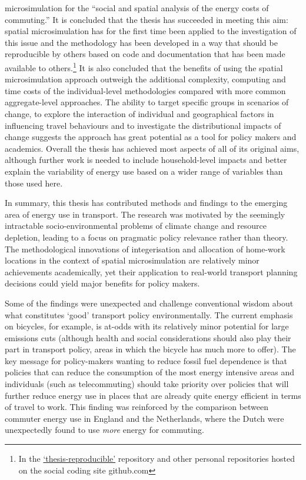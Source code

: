 microsimulation for the ``social and spatial analysis of the energy costs of
commuting.'' It is concluded that the thesis has succeeded in meeting this aim:
spatial microsimulation has for the first time been applied to the
investigation of this issue and the methodology has been developed in a way
that should be reproducible by others based on code and documentation that has
been made available to others.\footnote{In
the
{\color{blue}\href{https://github.com/Robinlovelace/thesis-reproducible}
{`thesis-reproducible'}} repository
and other personal repositories hosted on the social coding site github.com
}
It is also concluded that the benefits of using the spatial microsimulation
approach outweigh the additional complexity, computing and time costs of the
individual-level methodologies compared with more common aggregate-level
approaches. The ability to target specific groups in scenarios of change, to
explore the interaction of individual and geographical factors in influencing
travel behaviours and to investigate the distributional impacts of change
suggests the approach has great potential as a tool for policy makers and
academics. Overall the thesis has achieved most aspects of all of its original
aims, although further work is needed to include household-level impacts and
better explain the variability of energy use based on a wider range of
variables than those used here.

In summary, this thesis has contributed methods and findings to the emerging
area of energy use in transport. The research was motivated by the seemingly
intractable socio-environmental problems of climate change and resource
depletion, leading to a focus on pragmatic policy relevance rather than theory.
The methodological innovations of integerisation and allocation of home-work
locations in the context of spatial microsimulation are relatively minor
achievements academically, yet their application to real-world transport
planning decisions could yield major benefits for policy makers.

Some of the findings were unexpected and challenge conventional wisdom about
what constitutes `good' transport policy environmentally. The current
emphasis on bicycles, for example, is at-odds with its relatively
minor potential for large emissions cuts (although health and social
considerations should also play their part in transport policy, areas
in which the bicycle has much more to offer).
The key message for policy-makers wanting to reduce fossil fuel dependence
is that policies that can reduce the consumption
of the most energy intensive areas and individuals (such as telecommuting)
should take priority over policies that will further reduce energy use in
places that are already quite energy efficient in terms of travel to work.
This finding was reinforced by the comparison between 
commuter energy use in England and the Netherlands, where the Dutch were
unexpectedly found to use \emph{more} energy for commuting. 

